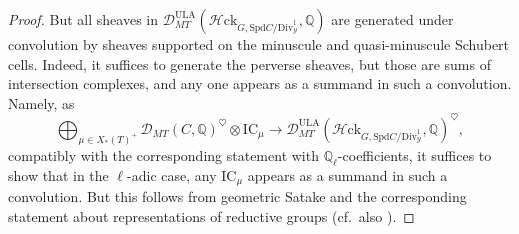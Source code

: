 \documentclass[11pt]{amsart}
\numberwithin{equation}{section}
\numberwithin{theorem}{section}
\theoremstyle{definition}
\newcommand{\Hloc}{{\mathcal H}{\mathrm{ck}}}
\begin{document}
\begin{proof}
But all sheaves in $\mathcal D_{MT}^{\mathrm{ULA}}(\Hloc_{G,\mathrm{Spd} C/\mathrm{Div}^1_{\mathcal Y}},\mathbb Q)$ are generated under convolution by sheaves supported on the minuscule and quasi-minuscule Schubert cells. Indeed, it suffices to generate the perverse sheaves, but those are sums of intersection complexes, and any one appears as a summand in such a convolution. Namely, as
\[
\bigoplus_{\mu\in X_\ast(T)^+} \mathcal D_{MT}(C,\mathbb Q)^\heartsuit\otimes \mathrm{IC}_\mu\to \mathcal D_{MT}^{\mathrm{ULA}}(\Hloc_{G,\mathrm{Spd} C/\mathrm{Div}^1_{\mathcal Y}},\mathbb Q)^\heartsuit,
\]
compatibly with the corresponding statement with $\mathbb Q_\ell$-coefficients, it suffices to show that in the $\ell$-adic case, any $\mathrm{IC}_\mu$ appears as a summand in such a convolution. But this follows from geometric Satake and the corresponding statement about representations of reductive groups (cf.~also \cite[Proposition 9.6]{NgoPolo}).
\end{proof}
\end{document}
